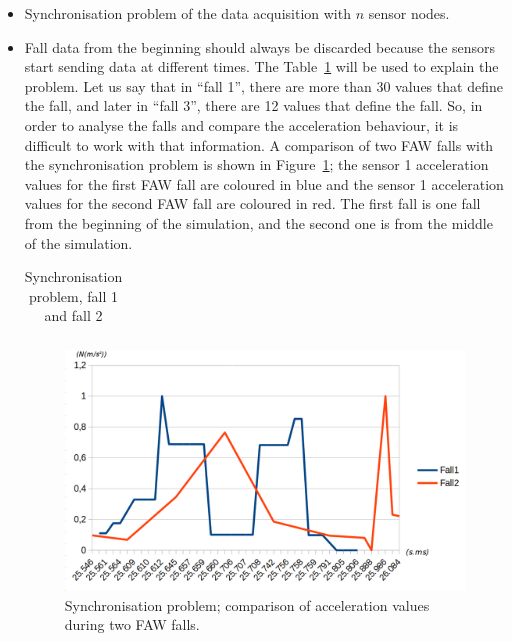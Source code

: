 \documentclass[review]{elsarticle}
\begin{document}
\begin{itemize}
 \item Synchronisation problem of the data acquisition with $n$ sensor nodes.
 \item Fall data from the beginning should always be discarded because
   the sensors start sending data at different times. The
   Table~\ref{tabla:Synchro} will be used to explain the problem. Let
   us say  
 that in ``fall 1'', there are more than 30 values that define the fall, and later in ``fall 3'', there are 
 12 values that define the fall. So, in order to analyse the falls and compare the acceleration behaviour, it is 
 difficult to work with that information. A comparison of two FAW falls with the synchronisation problem is shown
 in Figure~\ref{fig:synchronisation1}; the sensor 1 acceleration values for the first FAW fall are coloured in blue and the
 sensor 1 acceleration values for the second FAW fall are coloured in red. The first fall is one fall from the beginning
 of the simulation, and the second one is from the middle of the simulation.
 
 \begin{table}[!ht]
 \centering
 \begin{tabular}{*{5}{r}}
   
 \end{tabular}
 \caption{Synchronisation problem, fall 1 and fall 2}%
 \label{tabla:Synchro}
 \end{table}
 
 \begin{figure}[!ht]
  \centering
  \includegraphics[scale=0.2]{img/synchronisation1.png}
  \caption[Comparison acceleration during two FAW falls]{Synchronisation problem; comparison of acceleration values during two FAW falls.}
  \label{fig:synchronisation1}
 \end{figure}
 

\end{itemize}
\end{document}
